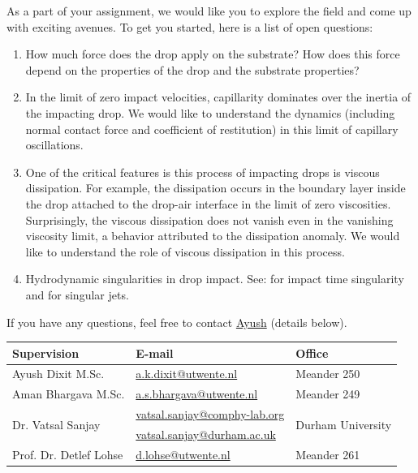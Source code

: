 \documentclass[a4paper,10pt]{article}
\begin{document}
As a part of your assignment, we would like you to explore the field and come up with exciting avenues. To get you started, here is a list of open questions:

\begin{enumerate}
 \item How much force does the drop apply on the substrate? How does this force depend on the properties of the drop and the substrate properties?
 \item In the limit of zero impact velocities, capillarity dominates over the inertia of the impacting drop. We would like to understand the dynamics (including normal contact force and coefficient of restitution) in this limit of capillary oscillations. 
 \item One of the critical features is this process of impacting drops is viscous dissipation. For example, the dissipation occurs in the boundary layer inside the drop attached to the drop-air interface in the limit of zero viscosities. Surprisingly, the viscous dissipation does not vanish even in the vanishing viscosity limit, a behavior attributed to the dissipation anomaly. We would like to understand the role of viscous dissipation in this process. 
 \item Hydrodynamic singularities in drop impact. See: \citet{mandre2012mechanism} for impact time singularity and \citet{Bartolo2006Singular, sanjay_lohse_jalaal_2021, zhang2022impact} for singular jets. 
\end{enumerate} 

If you have any questions, feel free to contact \href{mailto:a.k.dixit@utwente.nl}{Ayush} (details below).
\begin{center}
\begin{tabular}{|l|l|l|}
\hline \textbf{Supervision} & \textbf{E-mail} & \textbf{Office} \\
\hline Ayush Dixit M.Sc. & \href{mailto:a.k.dixit@utwente.nl}{a.k.dixit@utwente.nl} & Meander 250 \\
\hline Aman Bhargava M.Sc. & \href{mailto:a.s.bhargava@utwente.nl}{a.s.bhargava@utwente.nl} & Meander 249 \\
\hline \multirow{2}{*}{Dr. Vatsal Sanjay} & \href{mailto:vatsal.sanjay@comphy-lab.org}{vatsal.sanjay@comphy-lab.org} & \multirow{2}{*}{Durham University} \\
& \href{mailto:vatsal.sanjay@durham.ac.uk}{vatsal.sanjay@durham.ac.uk} & \\
\hline Prof. Dr. Detlef Lohse & \href{mailto:d.lohse@utwente.nl}{d.lohse@utwente.nl} & Meander 261  \\
\hline
\end{tabular}
\end{center}

\printbibliography
\end{document}
